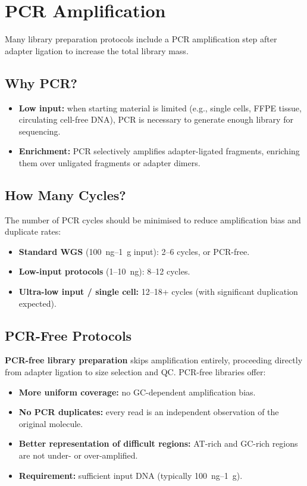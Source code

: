 \section{PCR Amplification}
\label{sec:pcr}

Many library preparation protocols include a PCR amplification step after adapter ligation to increase the total library mass.

\subsection{Why PCR?}

\begin{itemize}[nosep]
  \item \textbf{Low input:} when starting material is limited (e.g., single cells, FFPE tissue, circulating cell-free DNA), PCR is necessary to generate enough library for sequencing.
  \item \textbf{Enrichment:} PCR selectively amplifies adapter-ligated fragments, enriching them over unligated fragments or adapter dimers.
\end{itemize}

\subsection{How Many Cycles?}

The number of PCR cycles should be minimised to reduce amplification bias and duplicate rates:

\begin{itemize}[nosep]
  \item \textbf{Standard WGS} (100~ng--1~\textmu g input): 2--6 cycles, or PCR-free.
  \item \textbf{Low-input protocols} (1--10~ng): 8--12 cycles.
  \item \textbf{Ultra-low input / single cell:} 12--18+ cycles (with significant duplication expected).
\end{itemize}

\subsection{PCR-Free Protocols}

\textbf{PCR-free library preparation} skips amplification entirely, proceeding directly from adapter ligation to size selection and QC. PCR-free libraries offer:

\begin{itemize}[nosep]
  \item \textbf{More uniform coverage:} no GC-dependent amplification bias.
  \item \textbf{No PCR duplicates:} every read is an independent observation of the original molecule.
  \item \textbf{Better representation of difficult regions:} AT-rich and GC-rich regions are not under- or over-amplified.
  \item \textbf{Requirement:} sufficient input DNA (typically 100~ng--1~\textmu g).
\end{itemize}

